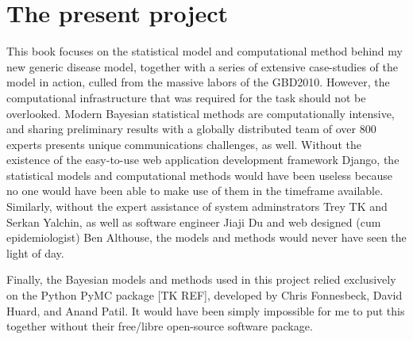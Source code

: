 \section{The present project}
This book focuses on the statistical model and computational method
behind my new generic disease model, together with a series of
extensive case-studies of the model in action, culled from the massive
labors of the GBD2010. However, the computational infrastructure that
was required for the task should not be overlooked. Modern Bayesian
statistical methods are computationally intensive, and sharing
preliminary results with a globally distributed team of over 800
experts presents unique communications challenges, as well. Without
the existence of the easy-to-use web application development framework
Django, the statistical models and computational methods would have
been useless because no one would have been able to make use of them
in the timeframe available.  Similarly, without the expert assistance
of system adminstrators Trey TK and Serkan Yalchin, as well as
software engineer Jiaji Du and web designed (cum epidemiologist) Ben
Althouse, the models and methods would never have seen the light of
day.

Finally, the Bayesian models and methods used in this project relied
exclusively on the Python PyMC package [TK REF], developed by Chris
Fonnesbeck, David Huard, and Anand Patil. It would have been simply
impossible for me to put this together without their free/libre
open-source software package.
